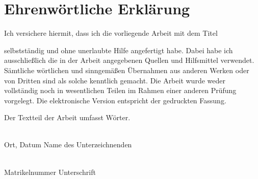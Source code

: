 \newpage
{}
\section*{Ehrenwörtliche Erklärung}

Ich versichere hiermit, dass ich die vorliegende Arbeit mit dem Titel

\begin{center}
    \normalsize\textit{\projecttitle} 
\end{center}

selbstständig und ohne unerlaubte Hilfe angefertigt habe. Dabei habe ich ausschließlich die in der Arbeit angegebenen Quellen und Hilfsmittel verwendet. Sämtliche wörtlichen und sinngemäßen Übernahmen aus anderen Werken oder von Dritten sind als solche kenntlich gemacht. Die Arbeit wurde weder vollständig noch in wesentlichen Teilen im Rahmen einer anderen Prüfung vorgelegt. Die elektronische Version entspricht der gedruckten Fassung.

\vspace{0.2cm}

Der Textteil der Arbeit umfasst \wordcount{} Wörter.

\vspace{0.9cm}

\noindent
\linedEntry{6.8cm}{\large\signaturelocation, \today} \hfill \linedEntry{6.8cm}{{\large\studentname}}\\
\noindent
Ort, Datum
\hfill
Name des Unterzeichnenden

\vspace{0.9cm}

\noindent
\linedEntry{6.8cm}{{\large\studentid}} \hfill \makebox[6.8cm]{\hrulefill} \\
\noindent
Matrikelnummer
\hfill
Unterschrift
